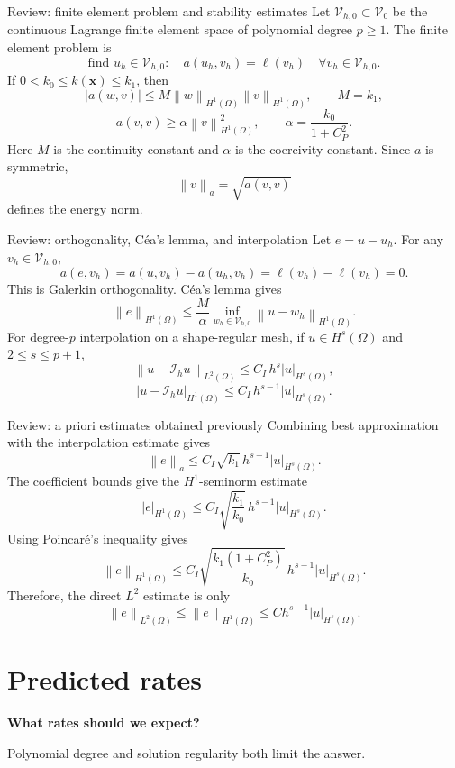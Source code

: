 \documentclass[11pt,aspectratio=169]{beamer}
\newcommand{\Om}{\Omega}
\newcommand{\Vzero}{\mathcal V_0}
\newcommand{\Vhzero}{\mathcal V_{h,0}}
\newcommand{\Ih}{\mathcal I_h}
\newcommand{\norm}[2][]{\left\lVert#2\right\rVert_{#1}}
\newcommand{\seminorm}[2][]{\left\lvert#2\right\rvert_{#1}}
\newcommand{\bx}{\bm x}
\begin{document}
\begin{frame}{Review: finite element problem and stability estimates}
Let $\Vhzero\subset\Vzero$ be the continuous Lagrange finite element space of
polynomial degree $p\geq1$. The finite element problem is
\[
  \boxed{\text{find }u_h\in\Vhzero:
  \quad a(u_h,v_h)=\ell(v_h)
  \quad\forall v_h\in\Vhzero.}
\]
If $0<k_0\leq k(\bx)\leq k_1$, then
\[
  |a(w,v)|\leq
  M\norm[H^1(\Om)]{w}\norm[H^1(\Om)]{v},
  \qquad M=k_1,
\]
\[
  a(v,v)\geq
  \alpha\norm[H^1(\Om)]{v}^2,
  \qquad \alpha=\frac{k_0}{1+C_P^2}.
\]
Here $M$ is the continuity constant and $\alpha$ is the coercivity constant.
Since $a$ is symmetric,
\[
  \norm[a]{v}=\sqrt{a(v,v)}
\]
defines the energy norm.
\end{frame}

\begin{frame}{Review: orthogonality, C\'ea's lemma, and interpolation}
Let $e=u-u_h$. For any $v_h\in\Vhzero$,
\[
  a(e,v_h)=a(u,v_h)-a(u_h,v_h)
  =\ell(v_h)-\ell(v_h)=0.
\]
This is Galerkin orthogonality. C\'ea's lemma gives
\[
  \norm[H^1(\Om)]{e}
  \leq\frac{M}{\alpha}
  \inf_{w_h\in\Vhzero}\norm[H^1(\Om)]{u-w_h}.
\]
For degree-$p$ interpolation on a shape-regular mesh, if
$u\in H^s(\Om)$ and $2\leq s\leq p+1$,
\[
  \norm[L^2(\Om)]{u-\Ih u}
  \leq C_I\,h^s\seminorm[H^s(\Om)]{u},
\]
\[
  \seminorm[H^1(\Om)]{u-\Ih u}
  \leq C_I\,h^{s-1}\seminorm[H^s(\Om)]{u}.
\]
\end{frame}

\begin{frame}{Review: a priori estimates obtained previously}
Combining best approximation with the interpolation estimate gives
\[
  \norm[a]{e}
  \leq C_I\sqrt{k_1}\,h^{s-1}\seminorm[H^s(\Om)]{u}.
\]
The coefficient bounds give the $H^1$-seminorm estimate
\[
  \boxed{\seminorm[H^1(\Om)]{e}
  \leq C_I\sqrt{\frac{k_1}{k_0}}\,
  h^{s-1}\seminorm[H^s(\Om)]{u}.}
\]
Using Poincar\'e's inequality gives
\[
  \norm[H^1(\Om)]{e}
  \leq C_I\sqrt{\frac{k_1(1+C_P^2)}{k_0}}\,
  h^{s-1}\seminorm[H^s(\Om)]{u}.
\]
Therefore, the direct $L^2$ estimate is only
\[
  \norm[L^2(\Om)]{e}
  \leq\norm[H^1(\Om)]{e}
  \leq C h^{s-1}\seminorm[H^s(\Om)]{u}.
\]
\end{frame}

\section{Predicted rates}

\begin{frame}[plain]
  \centering\vfill
  {\LARGE\bfseries What rates should we expect?\par}
  \vspace{0.45cm}
  {\large Polynomial degree and solution regularity both limit the answer.\par}
  \vfill
\end{frame}
\end{document}
